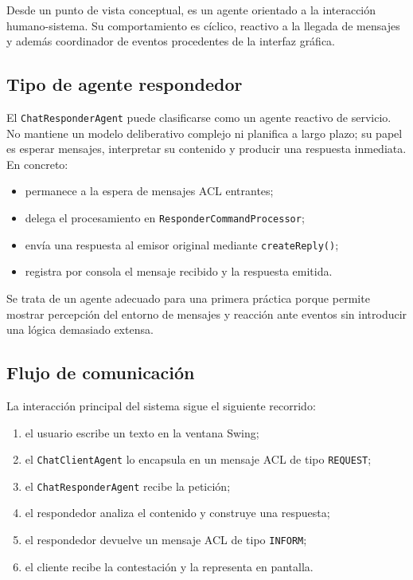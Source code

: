 \documentclass[12pt]{article}
\begin{document}
Desde un punto de vista conceptual, es un agente orientado a la interacción humano-sistema. Su comportamiento es cíclico, reactivo a la llegada de mensajes y además coordinador de eventos procedentes de la interfaz gráfica.

\subsection{Tipo de agente respondedor}
El \texttt{ChatResponderAgent} puede clasificarse como un agente reactivo de servicio. No mantiene un modelo deliberativo complejo ni planifica a largo plazo; su papel es esperar mensajes, interpretar su contenido y producir una respuesta inmediata. En concreto:

\begin{itemize}[leftmargin=*]
  \item permanece a la espera de mensajes ACL entrantes;
  \item delega el procesamiento en \texttt{ResponderCommandProcessor};
  \item envía una respuesta al emisor original mediante \texttt{createReply()};
  \item registra por consola el mensaje recibido y la respuesta emitida.
\end{itemize}

Se trata de un agente adecuado para una primera práctica porque permite mostrar percepción del entorno de mensajes y reacción ante eventos sin introducir una lógica demasiado extensa.

\subsection{Flujo de comunicación}
La interacción principal del sistema sigue el siguiente recorrido:

\begin{enumerate}[leftmargin=*]
  \item el usuario escribe un texto en la ventana Swing;
  \item el \texttt{ChatClientAgent} lo encapsula en un mensaje ACL de tipo \texttt{REQUEST};
  \item el \texttt{ChatResponderAgent} recibe la petición;
  \item el respondedor analiza el contenido y construye una respuesta;
  \item el respondedor devuelve un mensaje ACL de tipo \texttt{INFORM};
  \item el cliente recibe la contestación y la representa en pantalla.
\end{enumerate}
\end{document}

